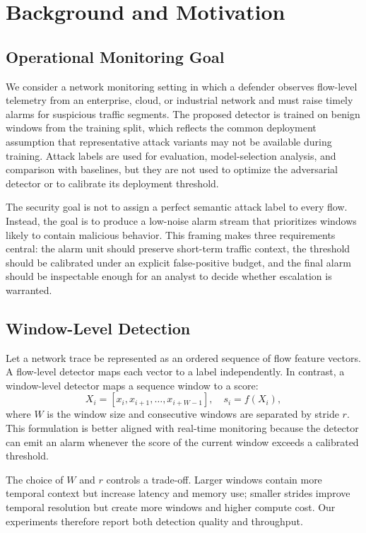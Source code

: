 \documentclass[conference]{IEEEtran}
\begin{document}
\section{Background and Motivation}
\subsection{Operational Monitoring Goal}
We consider a network monitoring setting in which a defender observes flow-level telemetry from an enterprise, cloud, or industrial network and must raise timely alarms for suspicious traffic segments. The proposed detector is trained on benign windows from the training split, which reflects the common deployment assumption that representative attack variants may not be available during training. Attack labels are used for evaluation, model-selection analysis, and comparison with baselines, but they are not used to optimize the adversarial detector or to calibrate its deployment threshold.

The security goal is not to assign a perfect semantic attack label to every flow. Instead, the goal is to produce a low-noise alarm stream that prioritizes windows likely to contain malicious behavior. This framing makes three requirements central: the alarm unit should preserve short-term traffic context, the threshold should be calibrated under an explicit false-positive budget, and the final alarm should be inspectable enough for an analyst to decide whether escalation is warranted.

\subsection{Window-Level Detection}
Let a network trace be represented as an ordered sequence of flow feature vectors. A flow-level detector maps each vector to a label independently. In contrast, a window-level detector maps a sequence window to a score:
\begin{equation}
  X_i = [x_i, x_{i+1}, \ldots, x_{i+W-1}], \quad s_i = f(X_i),
\end{equation}
where $W$ is the window size and consecutive windows are separated by stride $r$. This formulation is better aligned with real-time monitoring because the detector can emit an alarm whenever the score of the current window exceeds a calibrated threshold.

The choice of $W$ and $r$ controls a trade-off. Larger windows contain more temporal context but increase latency and memory use; smaller strides improve temporal resolution but create more windows and higher compute cost. Our experiments therefore report both detection quality and throughput.
\end{document}

